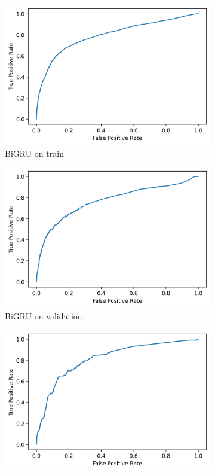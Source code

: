 \documentclass[utf8x]{ctexart}
\begin{document}
\begin{figure}[htb]
  \begin{subfigure}[b]{0.32\textwidth}
    \centering
    \includegraphics[width=\textwidth]{../images/BiGRU_train_roc.png}
    \caption{BiGRU on train}
    \label{fig:BiGRU_roc_train}
  \end{subfigure}
  \begin{subfigure}[b]{0.32\textwidth}
    \centering
    \includegraphics[width=\textwidth]{../images/BiGRU_val_roc.png}
    \caption{BiGRU on validation}
    \label{fig:BiGRU_roc_val}
  \end{subfigure}
  \begin{subfigure}[b]{0.32\textwidth}
    \centering
    \includegraphics[width=\textwidth]{../images/BiGRU_test_roc.png}

\end{subfigure}
\end{figure}
\end{document}
